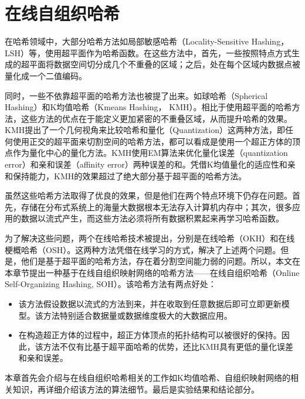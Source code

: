 
\chapter{ 在线自组织哈希}
\label{chap:SOH}

在哈希领域中，大部分哈希方法如局部敏感哈希（Locality-Sensitive Hashing，LSH）等，使用超平面作为哈希函数。在这些方法中，首先，一些按照特点方式生成的超平面将数据空间切分成几个不重叠的区域；之后，处在每个区域内数据点被量化成一个二值编码。

同时，一些不依靠超平面的哈希方法也被提了出来。如球哈希（Spherical Hashing）和K均值哈希（Kmeans Hashing， KMH）。相比于使用超平面的哈希方法，这些方法的优点在于能定义更加紧密的不重叠区域，从而提升哈希的效果。KMH提出了一个几何视角来比较哈希和量化（Quantization）这两种方法，即任何使用正交的超平面来切割空间的哈希方法，都可以看成是使用一个超正方体的顶点作为量化中心的量化方法。KMH使用EM算法来优化量化误差（quantization error）和亲和误差（affinity error）两种误差的和。凭借K均值量化的适应性和亲和保持能力，KMH的效果超过了绝大部分基于超平面的哈希方法。

虽然这些哈希方法取得了优良的效果，但是他们在两个特点环境下仍存在问题。首先，存储在分布式系统上的海量大数据根本无法存入计算机内存中；其次，很多应用的数据以流式产生，而这些方法必须将所有数据积累起来再学习哈希函数。

为了解决这些问题，两个在线哈希技术被提出，分别是在线哈希（OKH）和在线梗概哈希（OSH）。这两种方法凭借在线学习的方式，解决了上述两个问题。但是，他们是基于超平面的哈希方法，存在着分割空间能力弱的问题。所以，本文在本章节提出一种基于在线自组织映射网络的哈希方法——在线自组织哈希（Online Self-Organizing Hashing, SOH）。该哈希方法有两点好处：
 \begin{itemize}
 	\item 该方法假设数据以流式的方法到来，并在收取到任意数据后即可立即更新模型。该方法特别适合数据量或数据维度极大的大数据应用。
 	\item 在构造超正方体的过程中，超正方体顶点的拓扑结构可以被很好的保持。因此，该方法不仅有比基于超平面哈希的优势，还比KMH具有更低的量化误差和亲和误差。
 \end{itemize}

本章首先会介绍与在线自组织哈希相关的工作如K均值哈希、自组织映射网络的相关知识，再详细介绍该方法的算法细节。最后是实验结果和结论部分。

